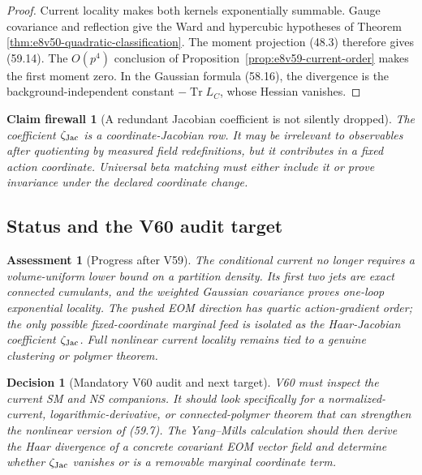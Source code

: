\documentclass[11pt,oneside]{book}
\newtheorem{assessment}[theorem]{Assessment}
\newtheorem{firewall}[theorem]{Claim firewall}
\newtheorem{decision}[theorem]{Decision}
\theoremstyle{definition}
\theoremstyle{remark}
\newcommand{\Tr}{\operatorname{Tr}}
\begin{document}
\begin{proof}
Current locality makes both kernels exponentially summable.
Gauge covariance and reflection give the Ward and hypercubic
hypotheses of Theorem
\ref{thm:e8v50-quadratic-classification}.  The moment projection
(48.3) therefore gives (59.14).  The \(O(p^4)\) conclusion of
Proposition~\ref{prop:e8v59-current-order} makes the first moment
zero.  In the Gaussian formula (58.16), the divergence is the
background-independent constant \(-\Tr L_C\), whose Hessian
vanishes.
\end{proof}

\begin{firewall}[A redundant Jacobian coefficient is not silently
dropped]
\label{fire:e8v59-Jacobian-marginal}
The coefficient \(\zeta_{\rm Jac}\) is a coordinate-Jacobian row.
It may be irrelevant to observables after quotienting by measured
field redefinitions, but it contributes in a fixed action
coordinate.  Universal beta matching must either include it or
prove invariance under the declared coordinate change.
\end{firewall}

\subsection{Status and the V60 audit target}

\begin{assessment}[Progress after V59]
\label{ass:e8v59-status}
The conditional current no longer requires a volume-uniform lower
bound on a partition density.  Its first two jets are exact
connected cumulants, and the weighted Gaussian covariance proves
one-loop exponential locality.  The pushed EOM direction has
quartic action-gradient order; the only possible fixed-coordinate
marginal feed is isolated as the Haar-Jacobian coefficient
\(\zeta_{\rm Jac}\).  Full nonlinear current locality remains tied
to a genuine clustering or polymer theorem.
\end{assessment}

\begin{decision}[Mandatory V60 audit and next target]
\label{dec:e8v59-next}
V60 must inspect the current SM and NS companions.  It should look
specifically for a normalized-current, logarithmic-derivative, or
connected-polymer theorem that can strengthen the nonlinear version
of (59.7).  The Yang--Mills calculation should then derive the Haar
divergence of a concrete covariant EOM vector field and determine
whether \(\zeta_{\rm Jac}\) vanishes or is a removable marginal
coordinate term.
\end{decision}
\end{document}
